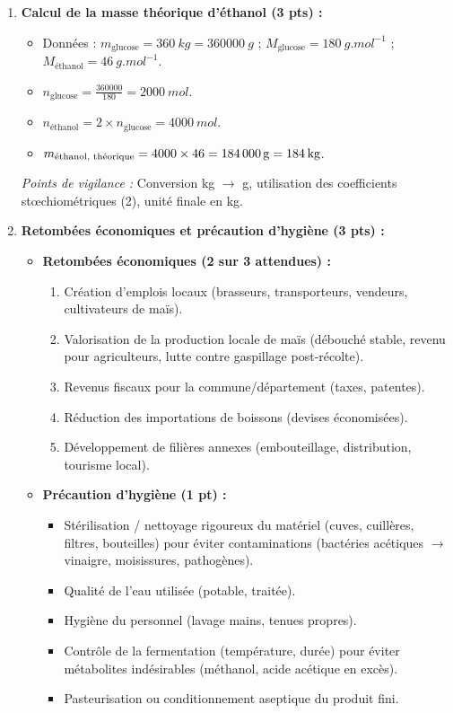 \documentclass[11pt]{article}
\begin{document}
\begin{corrige}
\begin{enumerate}
\item \textbf{Calcul de la masse théorique d'éthanol (3 pts) :}
\begin{itemize}
\item Données : $m_{\text{glucose}} = \SI{360}{kg} = \SI{360000}{g}$ ; $M_{\text{glucose}} = \SI{180}{g.mol^{-1}}$ ; $M_{\text{éthanol}} = \SI{46}{g.mol^{-1}}$.
\item $n_{\text{glucose}} = \frac{360000}{180} = \SI{2000}{mol}$.
\item $n_{\text{éthanol}} = 2 \times n_{\text{glucose}} = \SI{4000}{mol}$.
\item $m_{\text{éthanol, théorique}} = 4000 \times 46 = \SI{184000}{g} = \textbf{\SI{184}{kg}}$.
\end{itemize}
\textit{Points de vigilance :} Conversion kg $\rightarrow$ g, utilisation des coefficients stœchiométriques (2), unité finale en kg.

\item \textbf{Retombées économiques et précaution d'hygiène (3 pts) :}
\begin{itemize}
\item \textbf{Retombées économiques (2 sur 3 attendues) :}
\begin{enumerate}
\item Création d'emplois locaux (brasseurs, transporteurs, vendeurs, cultivateurs de maïs).
\item Valorisation de la production locale de maïs (débouché stable, revenu pour agriculteurs, lutte contre gaspillage post-récolte).
\item Revenus fiscaux pour la commune/département (taxes, patentes).
\item Réduction des importations de boissons (devises économisées).
\item Développement de filières annexes (embouteillage, distribution, tourisme local).
\end{enumerate}
\item \textbf{Précaution d'hygiène (1 pt) :}
\begin{itemize}
\item Stérilisation / nettoyage rigoureux du matériel (cuves, cuillères, filtres, bouteilles) pour éviter contaminations (bactéries acétiques $\rightarrow$ vinaigre, moisissures, pathogènes).
\item Qualité de l'eau utilisée (potable, traitée).
\item Hygiène du personnel (lavage mains, tenues propres).
\item Contrôle de la fermentation (température, durée) pour éviter métabolites indésirables (méthanol, acide acétique en excès).
\item Pasteurisation ou conditionnement aseptique du produit fini.
\end{itemize}
\end{itemize}
\end{enumerate}
\end{corrige}
\end{document}
